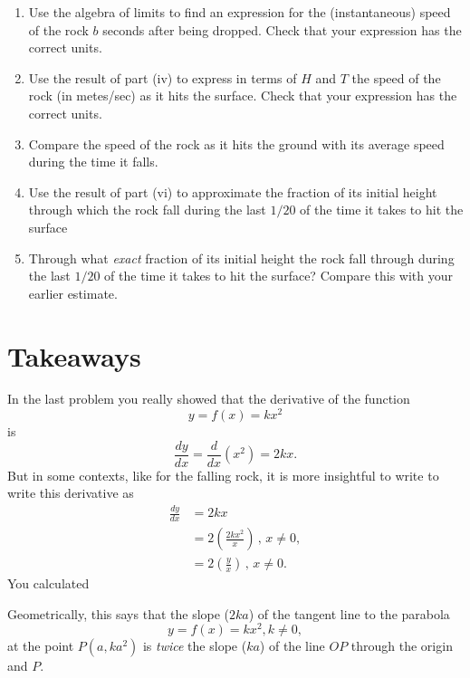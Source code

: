 \documentclass{ximera}
\begin{document}
\begin{question}
\begin{enumerate}
\begin{enumerate}
\item Use the algebra of limits to find an expression for the (instantaneous) speed of the rock $b$ seconds after being dropped. Check that your expression has the correct units.

\item Use the result of part (iv) to express in terms of $H$ and $T$ the speed of the rock (in metes/sec) as it hits the surface. Check that your expression has the correct units.

\item Compare the speed of the rock as it hits the ground with its average speed during the time it falls.

\item Use the result of part (vi) to approximate the fraction of its initial height through which the rock fall during the last $1/20$ of the time it takes to hit the surface

\item Through what \emph{exact} fraction of its initial height the rock fall through during the last $1/20$ of the time it takes to hit the surface? Compare this with your earlier estimate.

\end{enumerate}

\end{enumerate}


\end{question}


\section{Takeaways}

In the last problem you really showed that the derivative of the function
\[
     y = f(x) = kx^2
\]
is
\[
  \frac{dy}{dx} = \frac{d}{dx}\left(x^2 \right) = 2kx.
\]
But in some contexts, like for the falling rock, it is more insightful to write to write this derivative as
\begin{align*}
     \frac{dy}{dx} &= 2kx  \\
                          &= 2 \left( \frac{2kx^2}{x} \right) \, , \, x\neq 0, \\
                          &= 2 \left( \frac{y}{x} \right) \, , \, x\neq 0 .
\end{align*}
You calculated

Geometrically, this says that the slope ($2ka$) of the tangent line to the parabola
\[
     y=f(x) = kx^2 , k\neq 0,
\]
at the point $P(a,ka^2)$ is \emph{twice} the slope ($ka$) of the line $OP$ through the origin and $P$.
\end{document}
